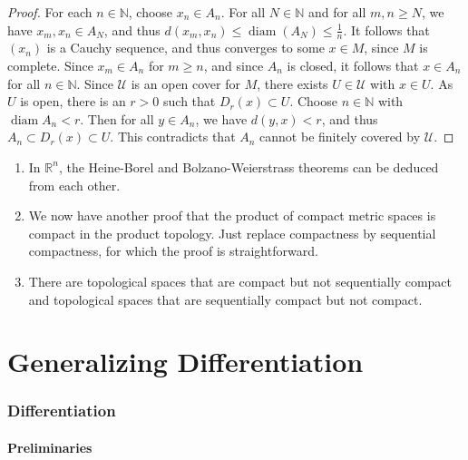 \documentclass[a4paper,11pt]{article}
\begin{document}
\begin{proof}
For each $n \in \mathbb{N}$, choose $x_{n} \in A_{n}$. For all $N \in \mathbb{N}$ and for all $m, n \geqslant N$, we have $x_{m}, x_{n} \in A_{N}$, and thus $d\left(x_{m}, x_{n}\right) \leqslant \operatorname{diam}\left(A_{N}\right)\le\frac{1}{n}$. It follows that $\left(x_{n}\right)$ is a Cauchy sequence, and thus converges to some $x \in M$, since $M$ is complete. Since $x_{m} \in A_{n}$ for $m \geqslant n$, and since $A_{n}$ is closed, it follows that $x \in A_{n}$ for all $n \in \mathbb{N}$. Since $\mathcal{U}$ is an open cover for $M$, there exists $U \in \mathcal{U}$ with $x \in U$. As $U$ is open, there is an $r>0$ such that $D_{r}(x) \subset U$. Choose $n \in \mathbb{N}$ with $\operatorname{diam} A_{n}<r$. Then for all $y \in A_{n}$, we have $d(y, x)<r$, and thus $A_{n} \subset D_{r}(x) \subset U$. This contradicts that $A_{n}$ cannot be finitely covered by $\mathcal{U}$.
\end{proof}

\begin{remark}
    \begin{enumerate}
        \item In $\mathbb{R}^{n}$, the Heine-Borel and Bolzano-Weierstrass theorems can be deduced from each other.
      
        \item We now have another proof that the product of compact metric spaces is compact in the product topology. Just replace compactness by sequential compactness, for which the proof is straightforward.
      
        \item There are topological spaces that are compact but not sequentially compact and topological spaces that are sequentially compact but not compact.
      
      \end{enumerate}
\end{remark}

\clearpage
\part{Generalizing Differentiation}
\section{Differentiation}
\subsection{Preliminaries}
\end{document}
